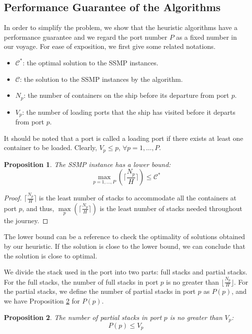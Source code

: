 \documentclass[review,3p,times,authoryear,12pt]{elsarticle}
\newtheorem{proposition}{Proposition}
\begin{document}
\subsection{Performance Guarantee of the Algorithms}
\label{sec:p2}

In order to simplify the problem, we show that the heuristic algorithms have a performance guarantee and we regard the port number $P$ as a fixed number in our voyage.
For ease of exposition, we first give some related notations.

\begin{itemize}
\item $\mathcal{C}^*$: the optimal solution to the SSMP instances.
\item $\mathcal{C}$: the solution to the SSMP instances by the algorithm.
\item $N_p$: the number of containers on the ship before its departure from port $p$.
\item $V_p$: the number of loading ports that the ship has visited before it departs from port $p$.
\end{itemize}

It should be noted that a port is called a loading port if there exists at least one container to be loaded. Clearly, $V_p \le p$, $\forall p=1,\ldots,P$.

\begin{proposition}
The SSMP instance has a lower bound:
\begin{equation*}
\max\limits_{p=1,\ldots,P}(\lceil\frac{N_p}{H}\rceil) \le \mathcal C^*
\end{equation*}
\label{pro:a1}
\end{proposition}

\begin{proof}

$\lceil\frac{N_p}{H}\rceil$ is the least number of stacks to accommodate all the containers at port $p$, and thus, $\max\limits_p(\lceil\frac{N_p}{H}\rceil)$ is the least number of stacks needed throughout the journey.
\end{proof}

The lower bound can be a reference to check the optimality of solutions obtained by our heuristic.
If the solution is close to the lower bound, we can conclude that the solution is close to optimal.

We divide the stack used in the port into two parts: full stacks and partial stacks.
For the full stacks, the number of full stacks in port $p$ is no greater than $\lfloor\frac{N_p}{H}\rfloor$.
For the partial stacks, we define the number of partial stacks in port $p$ as $P(p)$, and we have Proposition \ref{pro:a2} for $P(p)$.
\begin{proposition}
The number of partial stacks in port $p$ is no greater than $V_p$:
\begin{equation*}
 P(p) \le  V_p
\end{equation*}
\label{pro:a2}
\end{proposition}
\end{document}
